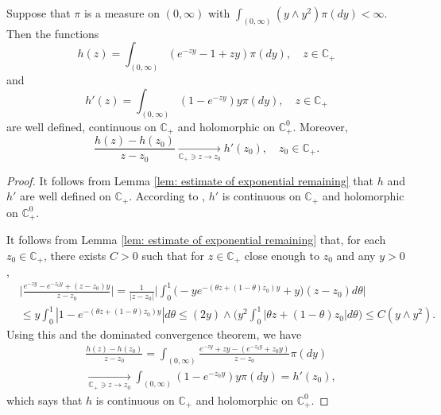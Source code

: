 \begin{lem}
\label{lem: extension lemma for branching mechanism}
    Suppose that  $\pi$ is a measure on $(0,\infty)$ with $\int_{(0,\infty)} (y \wedge y^2) \pi(dy)< \infty$.
    Then the functions
\begin{equation}
    h (z) = \int_{(0,\infty)} (e^{-zy} - 1 + zy) \pi(dy), \quad z \in \mathbb C_+
\end{equation}
    and
\begin{equation}
\label{eq: deriavetive of the Poission partb}
    h'(z) = \int_{(0,\infty)}(1- e^{-zy})y \pi(dy), \quad z \in \mathbb C_+
\end{equation}
    are well defined, continuous on $\mathbb C_+$ and holomorphic on $\mathbb C_+^0$.
    Moreover,
\[
    \frac{h(z)-h(z_0)}{z-z_0} \xrightarrow[\mathbb C_+\ni z \to z_0]{} h'(z_0),\quad z_0 \in \mathbb C_+.
\]
\end{lem}
\begin{proof}
    It follows from Lemma \ref{lem: estimate of exponential remaining} that $h$ and $h'$ are well defined on $\mathbb C_+$.
   According to \cite[Theorems 3.2. \& Proposition 3.6]{SchillingSongVondracek2010Bernstein}, 
    $h'$ is continuous on $\mathbb C_+$ and holomorphic on $\mathbb C_+^0$.

    It follows from Lemma \ref{lem: estimate of exponential remaining} that, for each $z_0 \in \mathbb C_+$,  there exists $C>0$ such that for $z \in \mathbb C_+$ close enough to $z_0$ and any
    $y>0$,
\begin{align}
    &\Big| \frac{e^{-zy} - e^{-z_0 y}+(z-z_0) y}{z-z_0} \Big|
    = \frac{1}{|z-z_0|}\Big| \int_0^1 \big(-y e^{-(\theta z+(1-\theta)z_0)y}+y\big)(z-z_0)d\theta\Big|
    \\ &\leq y\int_0^1 |1-e^{-(\theta z +(1-\theta)z_0)y}| d\theta
    \leq (2y) \wedge\Big( y^2\int_0^1|\theta z+(1-\theta)z_0|d\theta\Big)
    \leq C(y\wedge y^2).
\end{align}
    Using this and the dominated convergence theorem, we have
\begin{align}
    &\frac{h(z)-h(z_0)}{z-z_0} = \int_{(0,\infty)} \frac{e^{-zy}+zy -(e^{-z_0 y}+z_0 y)}{z-z_0}  \pi(dy)
    \\&\xrightarrow[\mathbb C_+\ni z\to z_0]{} \int_{(0,\infty)}(1 - e^{-z_0 y} )y\pi(dy) = h'(z_0),
\end{align}
    which says that $h$ is continuous on $\mathbb C_+$ and holomorphic on $\mathbb C_+^0$.
\end{proof}

